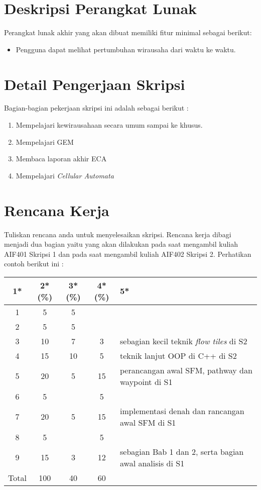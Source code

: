 \documentclass[a4paper,twoside]{article}
\begin{document}
\section{Deskripsi Perangkat Lunak}
Perangkat lunak akhir yang akan dibuat memiliki fitur minimal sebagai berikut:
\begin{itemize}
	\item Pengguna dapat melihat pertumbuhan wirausaha dari waktu ke waktu.
		
\end{itemize}

\section{Detail Pengerjaan Skripsi}
Bagian-bagian pekerjaan skripsi ini adalah sebagai berikut :
	\begin{enumerate}
		\item Mempelajari kewirausahaan secara umum sampai ke khusus.
		\item Mempelajari GEM
		\item Membaca laporan akhir ECA
		\item Mempelajari \textit{Cellular Automata} 
	\end{enumerate}

\section{Rencana Kerja}
Tuliskan rencana anda untuk menyelesaikan skripsi. Rencana kerja dibagi menjadi dua bagian yaitu yang akan dilakukan pada saat mengambil kuliah AIF401 Skripsi 1 dan pada saat mengambil kuliah AIF402 Skripsi 2. Perhatikan contoh berikut ini :


\begin{center}
  \begin{tabular}{ | c | c | c | c | l |}
    \hline
    1*  & 2*(\%) & 3*(\%) & 4*(\%) &5*\\ \hline \hline
    1   & 5  & 5  &  &  \\ \hline
    2   & 5 & 5  &   & \\ \hline
    3   & 10  & 7  & 3 & {\footnotesize sebagian kecil teknik {\it flow tiles} di S2}  \\ \hline
    4   & 15  & 10  &  5 & {\footnotesize teknik lanjut OOP di C++ di S2} \\ \hline
    5   & 20  & 5  & 15 & {\footnotesize perancangan awal SFM, pathway dan waypoint di S1} \\ \hline
    6   & 5 &   & 5  & \\ \hline
    7   & 20  & 5  & 15 &  {\footnotesize implementasi denah dan rancangan awal SFM di S1}\\ \hline
    8   & 5  &   &  5  & \\ \hline
    9   & 15  & 3  & 12  & {\footnotesize sebagian Bab 1 dan 2, serta bagian awal analisis di S1}\\ \hline
    Total  & 100  & 40  & 60 &  \\ \hline
                          \end{tabular}
\end{center}
\end{document}

